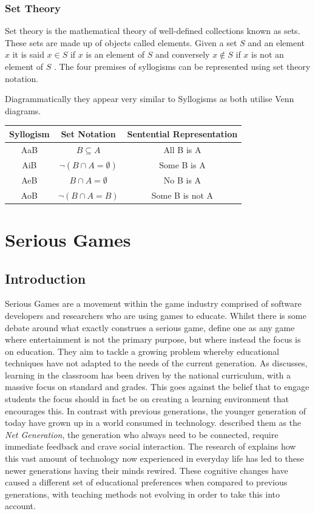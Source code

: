 \documentclass[12pt,a4paper]{report}
\begin{document}
\subsection{Set Theory}
Set theory is the mathematical theory of well-defined collections known as sets. These sets are made up of objects called elements. Given a set $S$ and an element $x$ it is said $x \in S$ if $x$ is an element of $S$ and conversely $x \notin S$ if $x$ is not an element of $S$ \citep{sep-set-theory}.
The four premises of syllogisms can be represented using set theory notation.

 Diagrammatically they appear very similar to Syllogisms as both utilise Venn diagrams.
 
\begin{center}
  \begin{tabular}{ c | c | c }
    Syllogism & Set Notation & Sentential Representation \\ \hline
    AaB & $B \subseteq A$ & All B is A \\
    AiB & $\neg(B \cap A = \emptyset)$ & Some B is A \\
    AeB & $B \cap A = \emptyset$ & No B is A \\
    AoB & $\neg(B \cap A = B)$ & Some B is not A \\
  \end{tabular}
\end{center}


\chapter{Serious Games}
\section{Introduction}
Serious Games are a movement within the game industry comprised of software developers and researchers who are using games to educate. Whilst there is some debate around what exactly construes a serious game, \cite{michael2005serious} define one as any game where entertainment is not the primary purpose, but where instead the focus is on education. They aim to tackle a growing problem whereby educational techniques have not adapted to the needs of the current generation. As \cite{lim2008spirit} discusses, learning in the classroom has been driven by the national curriculum, with a massive focus on standard and grades. This goes against the belief that to engage students the focus should in fact be on creating a learning environment that encourages this.  In contrast with previous generations, the younger generation of today have grown up in a world consumed in technology. \cite{oblinger2005educating} described them as the \textit{Net Generation}, the generation who always need to be connected, require immediate feedback and crave social interaction. The research of \cite{prensky2001games} explains how this vast amount of technology now experienced in everyday life has led to these newer generations having their minds rewired. These cognitive changes have caused a different set of educational preferences when compared to previous generations, with teaching methods not evolving in order to take this into account.
\end{document}
